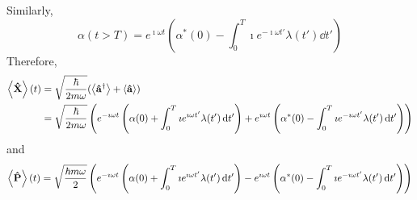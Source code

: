 \documentclass[a4paper,twoside]{article}
\begin{document}
\begin{itemize}
\begin{problem}
            Similarly,
            \begin{equation}
                \alpha(t>T) = e^{\imath \omega t} \left( \alpha^*(0) - \int_0^T \imath e^{-\imath \omega t'} \lambda(t') \dd{t'} \right)
            \end{equation}
            Therefore,
            \begin{align}
                \ev{ \vu{X}}(t) &=  \sqrt{\frac{\hbar}{2m \omega}} (\ev{ \vu{a}^\dagger} + \ev{ \vu{a}}) \\
                &= \sqrt{\frac{\hbar}{2m \omega}} \left( e^{- \imath \omega t} \left( \alpha(0) + \int_0^T \imath e^{\imath \omega t'} \lambda(t') \dd{t'} \right) + e^{\imath \omega t} \left( \alpha^*(0) - \int_0^T \imath e^{-\imath \omega t'} \lambda(t') \dd{t'} \right) \right)
            \end{align}
            and
            \begin{equation}
                \ev{ \vu{P}}(t) = \sqrt{\frac{\hbar m \omega}{2}} \left( e^{- \imath \omega t} \left( \alpha(0) + \int_0^T \imath e^{\imath \omega t'} \lambda(t') \dd{t'} \right) - e^{\imath \omega t} \left( \alpha^*(0) - \int_0^T \imath e^{-\imath \omega t'} \lambda(t') \dd{t'} \right) \right)
            \end{equation}


\end{problem}
\end{itemize}
\end{document}
